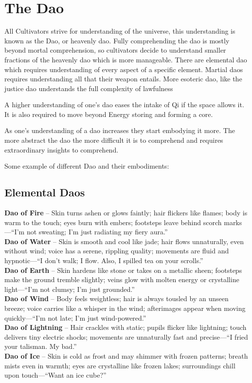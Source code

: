 \section{The Dao}

All Cultivators strive for understanding of the universe, this understanding is known as the Dao, or heavenly dao. Fully comprehending the dao is mostly beyond mortal comprehension, so cultivators decide to understand smaller fractions of the heavenly dao which is more manageable. There are elemental dao which requires understanding of every aspect of a specific element. Martial daos requires understanding all that their weapon entails. More esoteric dao, like the justice dao understands the full complexity of lawfulness

A higher understanding of one's dao eases the intake of Qi if the space allows it. It is also required to move beyond Energy storing and forming a core.

As one's understanding of a dao increases they start embodying it more. The more abstract the dao the more difficult it is to comprehend and requires extraordinary insights to comprehend. 

Some example of different Dao and their embodiments:

\subsection{Elemental Daos}

\textbf{Dao of Fire} – Skin turns ashen or glows faintly; hair flickers like flames; body is warm to the touch; eyes burn with embers; footsteps leave behind scorch marks—“I’m not sweating; I'm just radiating my fiery aura.” \\
\textbf{Dao of Water} – Skin is smooth and cool like jade; hair flows unnaturally, even without wind; voice has a serene, rippling quality; movements are fluid and hypnotic—“I don’t walk; I flow. Also, I spilled tea on your scrolls.”\\
\textbf{Dao of Earth} – Skin hardens like stone or takes on a metallic sheen; footsteps make the ground tremble slightly; veins glow with molten energy or crystalline light—“I’m not clumsy; I’m just grounded.”\\
\textbf{Dao of Wind} – Body feels weightless; hair is always tousled by an unseen breeze; voice carries like a whisper in the wind; afterimages appear when moving quickly—“I’m not late; I’m just wind-powered.”\\
\textbf{Dao of Lightning} – Hair crackles with static; pupils flicker like lightning; touch delivers tiny electric shocks; movements are unnaturally fast and precise—“I fried your talisman. My bad.”\\
\textbf{Dao of Ice} – Skin is cold as frost and may shimmer with frozen patterns; breath mists even in warmth; eyes are crystalline like frozen lakes; surroundings chill upon touch—“Want an ice cube?”


